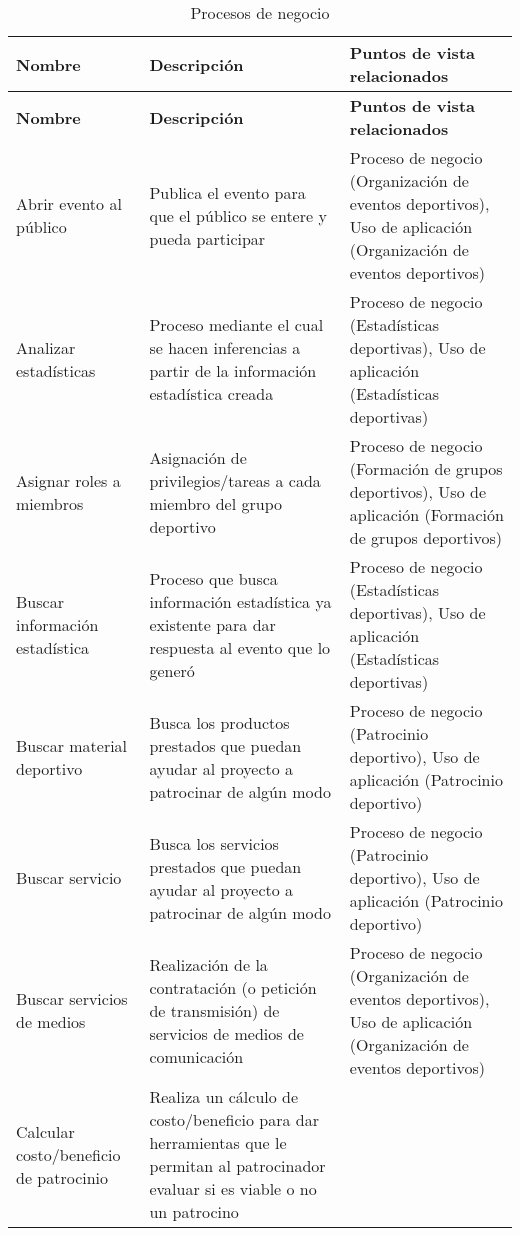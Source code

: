 \begin{center}
	\begin{longtable}{|p{4cm}|p{7cm}|p{4cm}|}
		\caption{Procesos de negocio \label{tab:procesos_negocio}} \\
		\hline
		\textbf{Nombre} &
		\textbf{Descripción} &
		\textbf{Puntos de vista relacionados} \\
		\hline
		\endfirsthead
		\hline
		\textbf{Nombre} &
		\textbf{Descripción} &
		\textbf{Puntos de vista relacionados} \\
		\hline
		\endhead
		\hline
		\endfoot
		\hline
		\endlastfoot
		Abrir evento al público & 
		Publica el evento para que el público se entere y pueda participar & 
		Proceso de negocio (Organización de eventos deportivos), Uso de aplicación (Organización de eventos deportivos)
		\\
		\hline
		Analizar estadísticas & 
		Proceso mediante el cual se hacen inferencias a partir de la información estadística creada & 
		Proceso de negocio (Estadísticas deportivas), Uso de aplicación (Estadísticas deportivas)
		\\
		\hline
		Asignar roles a miembros & 
		Asignación de privilegios/tareas a cada miembro del grupo deportivo & 
		Proceso de negocio (Formación de grupos deportivos), Uso de aplicación (Formación de grupos deportivos)
		\\
		\hline
		Buscar información estadística & 
		Proceso que busca información estadística ya existente para dar respuesta al evento que lo generó & 
		Proceso de negocio (Estadísticas deportivas), Uso de aplicación (Estadísticas deportivas)
		\\
		\hline
		Buscar material deportivo & 
		Busca los productos prestados que puedan ayudar al proyecto a patrocinar de algún modo & 
		Proceso de negocio (Patrocinio deportivo), Uso de aplicación (Patrocinio deportivo)
		\\
		\hline
		Buscar servicio & 
		Busca los servicios prestados que puedan ayudar al proyecto a patrocinar de algún modo & 
		Proceso de negocio (Patrocinio deportivo), Uso de aplicación (Patrocinio deportivo)
		\\
		\hline
		Buscar servicios de medios & 
		Realización de la contratación (o petición de transmisión) de servicios de medios de comunicación & 
		Proceso de negocio (Organización de eventos deportivos), Uso de aplicación (Organización de eventos deportivos)
		\\
		\hline
		Calcular costo/beneficio de patrocinio & 
		Realiza un cálculo de costo/beneficio para dar herramientas que le permitan al patrocinador evaluar si es viable o no un patrocino & 

\end{longtable}
\end{center}
